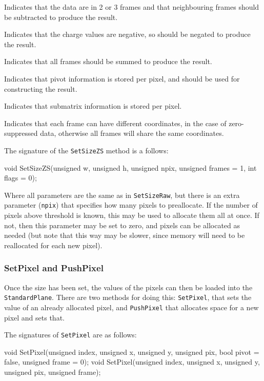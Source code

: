 \begin{description}
 Indicates that the data are in 2 or 3 frames
and that neighbouring frames should be subtracted to produce the result.

 Indicates that the charge values are negative,
so should be negated to produce the result.

 Indicates that all frames should be summed to produce the result.

 Indicates that pivot information is stored per pixel,
and should be used for constructing the result.

 Indicates that submatrix information is stored per pixel.

 Indicates that each frame can have different coordinates,
in the case of zero-suppressed data, otherwise all frames will share the same coordinates.

\end{description}

The signature of the \texttt{SetSizeZS} method is a follows:
\begin{listing}
void SetSizeZS(unsigned w, unsigned h, unsigned npix,
               unsigned frames = 1, int flags = 0);
\end{listing}

Where all parameters are the same as in \texttt{SetSizeRaw}, but there is an extra parameter (\texttt{npix})
that specifies how many pixels to preallocate.
If the number of pixels above threshold is known, this may be used to allocate them all at once.
If not, then this parameter may be set to zero, and pixels can be allocated as needed
(but note that this way may be slower, since memory will need to be reallocated for each new pixel).

\subsubsection{SetPixel and PushPixel}
Once the size has been set, the values of the pixels can then be loaded into the \texttt{StandardPlane}.
There are two methods for doing this: \texttt{SetPixel}, that sets the value of an already allocated pixel,
and \texttt{PushPixel} that allocates space for a new pixel and sets that.

The signatures of \texttt{SetPixel} are as follows:
\begin{listing}
void SetPixel(unsigned index, unsigned x, unsigned y, unsigned pix,
              bool pivot = false, unsigned frame = 0);
void SetPixel(unsigned index, unsigned x, unsigned y, unsigned pix,
              unsigned frame);
\end{listing}

